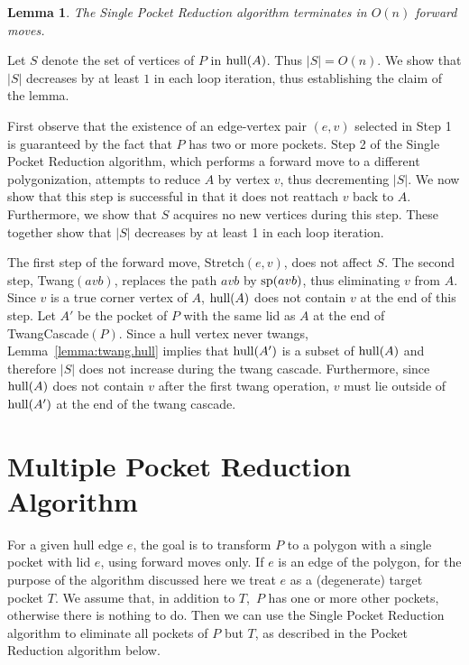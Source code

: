 \pdfoutput=1  \documentclass{article}
\def\hull{\mathop{\rm hull}\nolimits}
\def\sp{\mathop{\rm sp}\nolimits}
\def\st{{\sc Stretch}}
\def\tw{{\sc Twang}}
\def\twc{{\sc TwangCascade}}
\newtheorem{lemma}[theorem]{Lemma}
\newcommand{\lemlab}[1]{\label{lemma:#1}}
\newcommand{\seclab}[1]{\label{sec:#1}}
\newcommand{\lemref}[1]{\ref{lemma:#1}}
\newcommand{\ABox}{
\raisebox{3pt}{\framebox[6pt]{\rule{6pt}{0pt}}}
}
\newenvironment{pf}{{\bf Proof:}}{\hfill\ABox}
\begin{document}
\vspace{-0.8em}
\begin{lemma}
The {\sc Single Pocket Reduction} algorithm terminates in $O(n)$ forward moves.
\lemlab{single.pocket.reduction}
\end{lemma}
\begin{pf}
Let $S$ denote the set of vertices of $P$ in $\hull(A)$. Thus $|S| =
O(n)$. We show that $|S|$ decreases by at least $1$ in each loop
iteration, thus establishing the claim of the lemma.

First observe that the existence of an edge-vertex pair $(e, v)$
  selected in Step 1 is guaranteed by the fact that $P$ has two or
  more pockets.
Step 2 of the {\sc Single Pocket Reduction} algorithm, which performs
a forward move to a different polygonization,
attempts to reduce $A$ by vertex $v$, thus decrementing $|S|$. We now show
that this step is successful in that it
does not reattach $v$ back to $A$. Furthermore, we show that
$S$ acquires no new vertices during this step. These together
show that $|S|$ decreases by at least 1 in each loop iteration.

The first step of the forward move, \st$(e, v)$, does not affect $S$.
The second step, \tw$(avb)$, replaces
the path $avb$ by $\sp(avb)$, thus eliminating $v$ from
$A$. Since $v$ is a true corner vertex of $A$, $\hull(A)$
does not contain $v$ at the end of this step. Let $A'$ be the pocket of $P$
with the same lid as $A$ at the end of \twc$(P)$. Since a hull vertex never twangs,
Lemma~\lemref{twang.hull} implies that
$\hull(A')$ is a subset of $\hull(A)$ and therefore $|S|$ does
not increase during the twang cascade. Furthermore, since
$\hull(A)$ does not contain $v$ after the first twang operation,
$v$ must lie outside of $\hull(A')$ at the end of the twang
cascade. \end{pf}



\vspace{-0.4em}
\section{Multiple Pocket Reduction Algorithm}
\seclab{multiple.pocket.reduction} For a given hull edge $e$, the
goal is to transform $P$ to a polygon with a single pocket with lid
$e$, using forward moves only. If $e$ is an edge of the polygon, for
the purpose of the algorithm discussed here we treat $e$ as a
(degenerate) target pocket $T$. We assume that, in addition to
$T$,~$P$ has one or more other pockets, otherwise there is nothing to do.
Then we can use the {\sc Single Pocket Reduction} algorithm to
eliminate all pockets of $P$ but $T$, as described in the {\sc
Pocket Reduction} algorithm below.
\end{document}
